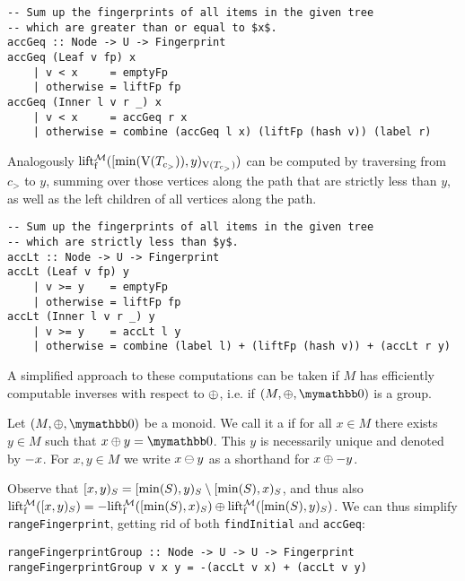 \begin{verbatim}
-- Sum up the fingerprints of all items in the given tree
-- which are greater than or equal to $x$.
accGeq :: Node -> U -> Fingerprint
accGeq (Leaf v fp) x
    | v < x     = emptyFp
    | otherwise = liftFp fp
accGeq (Inner l v r _) x
    | v < x     = accGeq r x
    | otherwise = combine (accGeq l x) (liftFp (hash v)) (label r)
\end{verbatim}

Analogously $\operatorname{lift_{\operatorname{f}}^{\mathcal{M}}}([{\min(\operatorname{V}(T_{c_{>}}))},{y})_{\operatorname{V}(T_{c_{>}})})$ can be computed by traversing from $c_{>}$ to $y$, summing over those vertices along the path that are strictly less than $y$, as well as the left children of all vertices along the path.

\begin{verbatim}
-- Sum up the fingerprints of all items in the given tree
-- which are strictly less than $y$.
accLt :: Node -> U -> Fingerprint
accLt (Leaf v fp) y
    | v >= y    = emptyFp
    | otherwise = liftFp fp
accLt (Inner l v r _) y
    | v >= y    = accLt l y
    | otherwise = combine (label l) + (liftFp (hash v)) + (accLt r y)
\end{verbatim}

A simplified approach to these computations can be taken if $M$ has efficiently computable inverses with respect to $\oplus$, i.e. if $(M, \groupaddsym, \neutraladd)$ is a group.

\begin{definition}
Let $(M, \groupaddsym, \neutraladd)$ be a monoid.
We call it a  if for all $x \in M$ there exists $y \in M$ such that $\groupadd{x}{y} = \neutraladd$.
This $y$ is necessarily unique and denoted by $-{x}$.
For $x, y \in M$ we write ${x} \ominus {y}$ as a shorthand for ${x} \oplus {-{y}}$.
\end{definition}

Observe that $[{x},{y})_{S} = [{\min(S)},{y})_{S} \setminus [{\min(S)},{x})_{S}$, and thus also $\operatorname{lift_{\operatorname{f}}^{\mathcal{M}}}([{x},{y})_{S}) = {-{\operatorname{lift_{\operatorname{f}}^{\mathcal{M}}}([{\min(S)},{x})_{S})}} \oplus {\operatorname{lift_{\operatorname{f}}^{\mathcal{M}}}([{\min(S)},{y})_{S})}$. We can thus simplify \texttt{rangeFingerprint}, getting rid of both \texttt{findInitial} and \texttt{accGeq}:

\begin{verbatim}
rangeFingerprintGroup :: Node -> U -> U -> Fingerprint
rangeFingerprintGroup v x y = -(accLt v x) + (accLt v y)
\end{verbatim}


